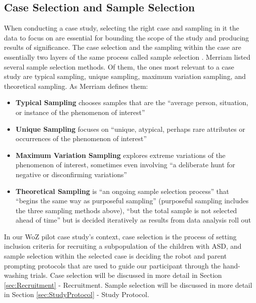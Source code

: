 \subsection{Case Selection and Sample Selection}
When conducting a case study, selecting the right case and sampling in it the data to focus on are essential for bounding the scope of the study and producing results of significance.  The case selection and the sampling within the case are essentially two layers of the same process called sample selection \cite{merriam2014qualitative}.  Merriam \cite{merriam2014qualitative} listed several sample selection methods.  Of them, the ones most relevant to a case study are typical sampling, unique sampling, maximum variation sampling, and theoretical sampling. As Merriam defines them:
\begin{itemize}
	\item \textbf{Typical Sampling} chooses samples that are the ``average person, situation, or instance of the phenomenon of interest''
	\item \textbf{Unique Sampling} focuses on ``unique, atypical, perhaps rare attributes or occurrences of the phenomenon of interest''
	\item \textbf{Maximum Variation Sampling} explores extreme variations of the phenomenon of interest, sometimes even involving ``a deliberate hunt for negative or disconfirming variations''
	\item \textbf{Theoretical Sampling}  is ``an ongoing sample selection process'' that ``begins the same way as purposeful sampling'' (purposeful sampling includes the three sampling methods above), ``but the total sample is not selected ahead of time'' but is decided iteratively as results from data analysis roll out
\end{itemize}

In our WoZ pilot case study's context, case selection is the process of setting inclusion criteria for recruiting a subpopulation of the children with ASD, and sample selection within the selected case is deciding the robot and parent prompting protocols that are used to guide our participant through the hand-washing trials.  Case selection will be discussed in more detail in Section \ref{sec:Recruitment} - Recruitment.  Sample selection will be discussed in more detail in Section \ref{sec:StudyProtocol} - Study Protocol.


